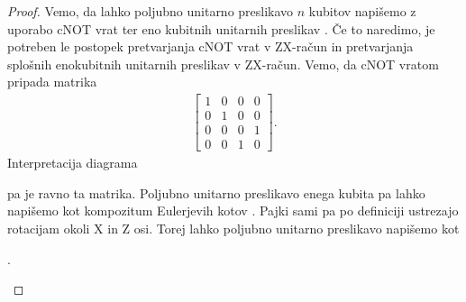\documentclass[mat1]{fmfdelo}
\begin{document}
\begin{proof}
Vemo, da lahko poljubno unitarno preslikavo \(n\) kubitov napišemo z uporabo \textsf{cNOT} vrat ter eno kubitnih unitarnih preslikav \cite[Izrek 5.26]{mathforqm}. Če to naredimo, je potreben le postopek pretvarjanja \textsf{cNOT} vrat v ZX-račun in pretvarjanja splošnih enokubitnih unitarnih preslikav v ZX-račun. Vemo, da \textsf{cNOT} vratom pripada matrika
\begin{align*}
    \begin{bmatrix}
        1&0&0&0\\
        0&1&0&0\\
        0&0&0&1\\
        0&0&1&0
    \end{bmatrix}.
\end{align*}
Interpretacija diagrama
\begin{center}
\end{center}
pa je ravno ta matrika. Poljubno unitarno preslikavo enega kubita pa lahko napišemo kot kompozitum Eulerjevih kotov \cite[Izrek 5.11]{mathforqm}. Pajki sami pa po definiciji ustrezajo rotacijam okoli X in Z osi. Torej lahko poljubno unitarno preslikavo napišemo kot
\begin{center}
    .
\end{center}

\end{proof}
\end{document}
